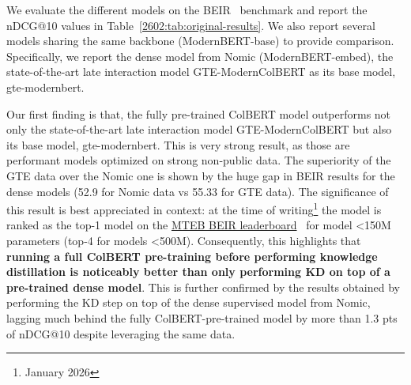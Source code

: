 We evaluate the different models on the BEIR~\cite{thakur2021beir} benchmark and report the nDCG@10 values in Table~\ref{2602:tab:original-results}. We also report several models sharing the same backbone (ModernBERT-base) to provide comparison. Specifically, we report the dense model from Nomic (ModernBERT-embed), the state-of-the-art late interaction model GTE-ModernColBERT as its base model, gte-modernbert. 

Our first finding is that, the fully pre-trained ColBERT model outperforms not only the state-of-the-art late interaction model GTE-ModernColBERT but also its base model, gte-modernbert. This is very strong result, as those are performant models optimized on strong non-public data. The superiority of the GTE data over the Nomic one is shown by the huge gap in BEIR results for the dense models (52.9 for Nomic data vs 55.33 for GTE data). The significance of this result is best appreciated in context: at the time of writing\footnote{January 2026} the model is ranked as the top-1 model on the \href{https://huggingface.co/spaces/mteb/leaderboard}{MTEB BEIR leaderboard}~\cite{muennighoff2022mteb} for model <150M parameters (top-4 for models <500M). Consequently,  this highlights that \textbf{running a full ColBERT pre-training before performing knowledge distillation is noticeably better than only performing KD on top of a pre-trained dense model}. This is further confirmed by the results obtained by performing the KD step on top of the dense supervised model from Nomic, lagging much behind the fully ColBERT-pre-trained model by more than 1.3 pts of nDCG@10 despite leveraging the same data. 


